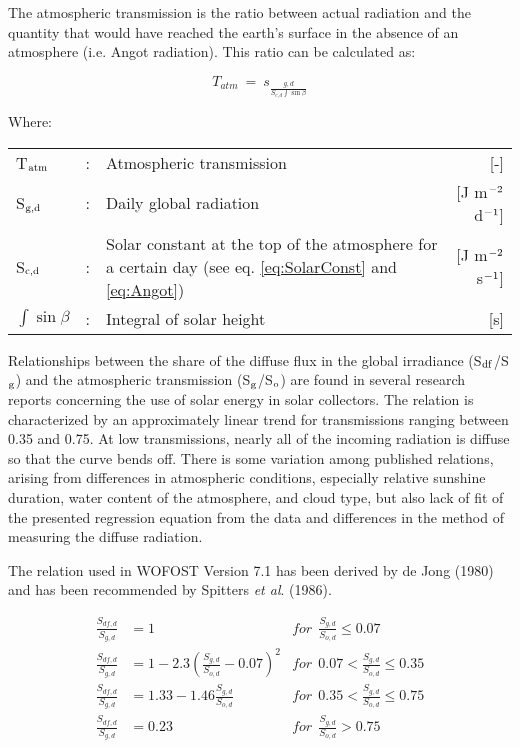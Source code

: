 The atmospheric transmission is the ratio between actual radiation and the quantity that
would have reached the earth's surface in the absence of an atmosphere (i.e. Angot
radiation). This ratio can be calculated as:

\begin{equation}
\label{eq:Tatm}
T _{atm} ~=~ s _{\frac{g,d}{S _{c,d} \int \sin \beta }}
\end{equation}

Where:\\[5pt]
\begin{tabularx}{\textwidth}{llXr}
	T$_{{\rm atm}}$ &:& Atmospheric transmission  & [-]\\
	S$_{{\rm g,d}}$ &:& Daily global radiation  & [J m$^{{\rm -2}}$ d$^{{\rm -1}}$]\\
	S$_{{\rm c,d}}$ &:& Solar constant at the top of the atmosphere for a certain day 
	(see eq. \ref{eq:SolarConst} and \ref{eq:Angot})  & [J m$^{{\rm -2}}$ s$^{{\rm -1}}$]\\
	$\int \sin \beta$  &:& Integral of solar height   & [s]\\
\end{tabularx}

Relationships between the share of the diffuse flux in the global irradiance 
(S$_{{\rm df}}$/S$_{{\rm g}}$) and the atmospheric transmission 
(S$_{{\rm g}}$/S$_{{\rm o}}$) are found in several research reports concerning the use
of solar energy in solar collectors. The relation is characterized by an approximately
linear trend for transmissions ranging between 0.35 and 0.75. At low transmissions,
nearly all of the incoming radiation is diffuse so that the curve bends off.
There is some variation among published relations, arising from differences in atmospheric 
conditions, especially relative sunshine duration, water content of the atmosphere,
and cloud type, but also lack of fit of the presented regression equation from the data and
differences in the method of measuring the diffuse radiation.

The relation used in WOFOST Version 7.1 has been derived by de Jong (1980) and has
been recommended by Spitters {\it et al}. (1986).

\begin{align}
\label{eq:irrad_diffuse}
{\frac{S _{df,d} }{S _{g, d} }} &= 1 & 
for ~~ {\frac{S _{g,d} }{S _{o,d} }} \le 0.07 \nonumber \\
{\frac{S _{df,d} }{S _{g,d} }} &= 1-2.3({\frac{S _{g,d} }{S _{o,d} }} -0.07) ^{2} & 
for ~~ 0.07 < {\frac{S _{g,d} }{S _{o,d} }} \le 0.35  \nonumber \\
{\frac{S _{df,d} }{S _{g,d} }} &= 1.33-1.46{\frac{S _{g,d} }{S _{o,d} }} &
for ~~ 0.35 < {\frac{S _{g,d} }{S _{o,d} }} \le 0.75 \nonumber \\
{\frac{S _{df,d} }{S _{g,d} }} &= 0.23 &
for ~~ {\frac{S _{g,d} }{S _{o,d} }} > 0.75 \nonumber \\
\end{align}

